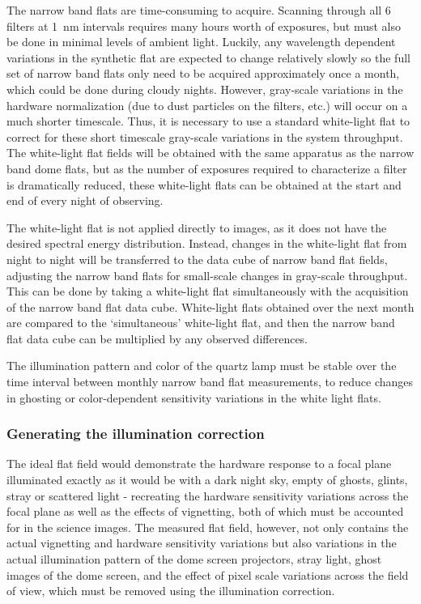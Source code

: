 \documentclass[12pt,preprint]{aastex}
\begin{document}
The narrow band flats are time-consuming to acquire. Scanning through
all 6 filters at 1~nm intervals requires many hours worth of
exposures, but must also be done in minimal levels of ambient
light. Luckily, any wavelength dependent variations in the synthetic
flat are expected to change relatively slowly so the full set of
narrow band flats only need to be acquired approximately once a month,
which could be done during cloudy nights. However, gray-scale
variations in the hardware normalization (due to dust particles on the
filters, etc.) will occur on a much shorter timescale.  Thus, it is
necessary to use a standard white-light flat to correct for these
short timescale gray-scale variations in the system throughput.  The
white-light flat fields will be obtained with the same apparatus as
the narrow band dome flats, but as the number of exposures required to
characterize a filter is dramatically reduced, these white-light flats
can be obtained at the start and end of every night of observing.

The white-light flat is not applied directly to images, as it
does not have the desired spectral energy distribution. Instead,
changes in the white-light flat from night to night will be
transferred to the data cube of narrow band flat fields, adjusting the
narrow band flats for small-scale changes in gray-scale
throughput. This can be done by taking a white-light flat
simultaneously with the acquisition of the narrow band flat data
cube. White-light flats obtained over the next month are compared to
the `simultaneous' white-light flat, and then the narrow band flat
data cube can be multiplied by any observed differences.

The illumination pattern and color of the quartz lamp must be stable
over the time interval between monthly narrow band flat measurements,
to reduce changes in ghosting or color-dependent sensitivity
variations in the white light flats.

\subsubsection{Generating the illumination correction}
\label{sec:ic}

The ideal flat field would demonstrate the hardware response to a
focal plane illuminated exactly as it would be with a dark night sky,
empty of ghosts, glints, stray or scattered light - recreating the
hardware sensitivity variations across the focal plane as well as the
effects of vignetting, both of which must be accounted for in the
science images. The measured flat field, however, not only contains
the actual vignetting and hardware sensitivity variations but also
variations in the actual illumination pattern of the dome screen
projectors, stray light, ghost images of the dome screen, and the
effect of pixel scale variations across the field of view, which must
be removed using the illumination correction. 
\end{document}
